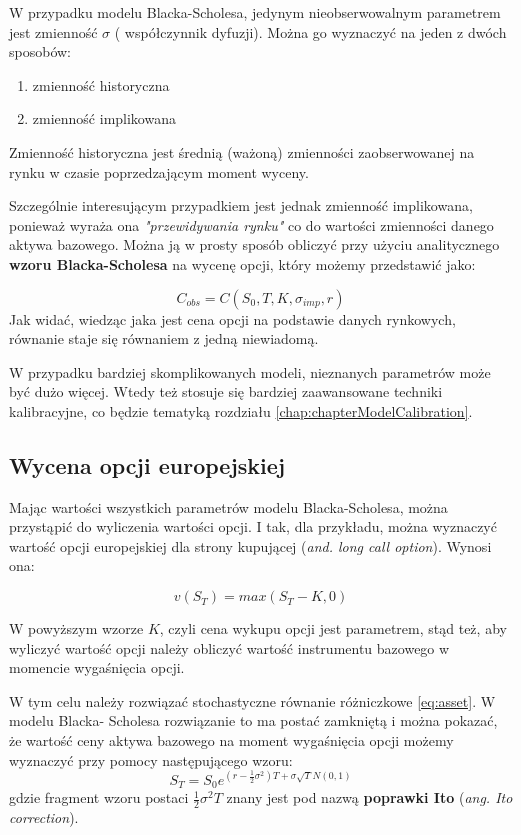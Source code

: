 \documentclass{pracamgr}
\begin{document}
W przypadku modelu Blacka-Scholesa, jedynym nieobserwowalnym parametrem jest zmienność $\sigma$ (
współczynnik dyfuzji). Można go wyznaczyć na jeden z dwóch sposobów:
\begin{enumerate}
  \item zmienność historyczna
  \item zmienność implikowana
\end{enumerate}

Zmienność historyczna jest średnią (ważoną) zmienności zaobserwowanej na rynku w czasie 
poprzedzającym moment wyceny.

Szczególnie interesującym przypadkiem jest jednak zmienność implikowana, ponieważ 
wyraża ona \textit{"przewidywania rynku"} co do wartości zmienności danego aktywa bazowego. 
Można ją w prosty sposób obliczyć przy użyciu analitycznego \textbf{wzoru Blacka-Scholesa} na 
wycenę opcji, który możemy przedstawić jako:

\begin{equation}
  C_{obs} = C(S_0, T, K, \sigma_{imp}, r)
\end{equation}
Jak widać, wiedząc jaka jest cena opcji na podstawie danych rynkowych, równanie staje się równaniem z 
jedną niewiadomą. 

W przypadku bardziej skomplikowanych modeli, nieznanych parametrów może być dużo więcej. Wtedy też 
stosuje się bardziej zaawansowane techniki kalibracyjne, co będzie tematyką 
rozdziału \ref{chap:chapterModelCalibration}.


\subsection{Wycena opcji europejskiej} %
\label{sub:subsection_name}
 
Mając wartości wszystkich parametrów modelu Blacka-Scholesa, można przystąpić
do wyliczenia wartości opcji. I tak, dla przykładu, można wyznaczyć wartość opcji europejskiej dla 
strony kupującej (\textit{and. long call option}). Wynosi ona:

\begin{equation}
  v(S_T) = max(S_T-K, 0)
\end{equation}

W powyższym wzorze $K$, czyli cena wykupu opcji jest parametrem, stąd też, aby 
wyliczyć wartość opcji należy obliczyć wartość instrumentu bazowego w momencie wygaśnięcia opcji.

W tym celu należy rozwiązać stochastyczne równanie różniczkowe \ref{eq:asset}. W modelu Blacka-
Scholesa rozwiązanie to ma postać zamkniętą i można pokazać, że wartość ceny aktywa bazowego na 
moment wygaśnięcia opcji możemy wyznaczyć przy pomocy następującego wzoru:
\begin{equation}
\label{eq:closedFormBlack} 
  S_T = S_0 e^{(r - \frac{1}{2} \sigma^2)T+\sigma \sqrt{T} N(0,1)}
\end{equation}
gdzie fragment wzoru postaci $\frac{1}{2} \sigma^2 T$ znany jest pod 
nazwą \textbf{poprawki Ito} (\textit{ang. Ito correction}).
\end{document}
